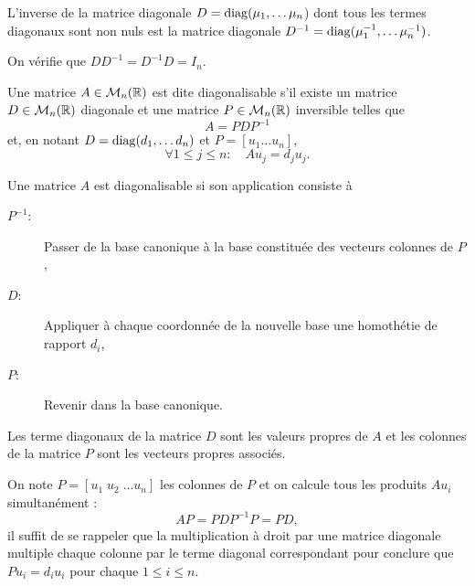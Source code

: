 \begin{lemma*}
  L'inverse de la matrice diagonale $D = \operatorname{diag}(\mu_1, \dots \mu_n$) dont tous les termes diagonaux sont non nuls est la matrice diagonale $D^{-1} = \operatorname{diag}(\mu_1^{-1}, \dots \mu_n^{-1})$.
\end{lemma*}

\proof
On vérifie que $D D^{-1} = D^{-1} D = I_n$.
\eproof

\begin{definition*}
  Une matrice $A \in \mathcal{M}_n(\mathbb{R})$ est dite diagonalisable s'il existe un matrice $D \in \mathcal{M}_n(\mathbb{R})$ diagonale et une matrice $P \in \mathcal{M}_n(\mathbb{R})$ inversible telles que
  $$
  A = P D P^{-1}
  $$
  et, en notant $D = \operatorname{diag}(d_1, \dots d_n)$ et $P = [u_1 \dots u_n]$, 
  $$
  \forall 1 \leq j \leq n: \quad A u_j = d_j u_j.
  $$
\end{definition*}

\remark
Une matrice $A$ est diagonalisable si son application consiste à
\begin{description}
 \item[$P^{-1}$:] Passer de la base canonique à la base constituée des vecteurs colonnes de $P$,
 \item[$D$:] Appliquer à chaque coordonnée de la nouvelle base une homothétie de rapport $d_i$,
 \item[$P$:] Revenir dans la base canonique.
\end{description}

\begin{proposition*}
  Les terme diagonaux de la matrice $D$ sont les valeurs propres de $A$ et les colonnes de la matrice $P$ sont les vecteurs propres associés.
\end{proposition*}

\proof
  On note $P = [u_1 \; u_2 \; \dots u_n]$ les colonnes de $P$ et on calcule tous les produits $A u_i$ simultanément : 
  $$
  A P = P D P^{-1} P = P D,
  $$
  il suffit de se rappeler que la multiplication à droit par une matrice diagonale multiple chaque colonne par le terme diagonal correspondant pour conclure que $P u_i = d_i u_i$ pour chaque $1 \leq i \leq n$.
\eproof



